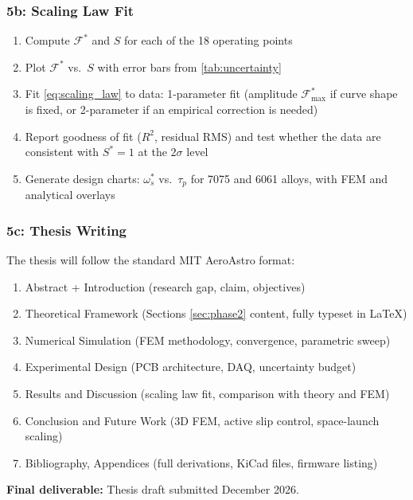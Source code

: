 \documentclass[12pt,letterpaper]{article}
\begin{document}
\subsubsection{5b: Scaling Law Fit}

\begin{enumerate}[noitemsep, label=\arabic*.]
  \item Compute $\mathcal{F}^*$ and $S$ for each of the 18 operating points
  \item Plot $\mathcal{F}^*$ vs.\ $S$ with error bars from \cref{tab:uncertainty}
  \item Fit \cref{eq:scaling_law} to data: 1-parameter fit (amplitude $\mathcal{F}^*_{\max}$
    if curve shape is fixed, or 2-parameter if an empirical correction is needed)
  \item Report goodness of fit ($R^2$, residual RMS) and test whether the data
    are consistent with $S^* = 1$ at the $2\sigma$ level
  \item Generate design charts: $\omega_s^*$ vs.\ $\tau_p$ for 7075 and 6061 alloys,
    with FEM and analytical overlays
\end{enumerate}

\subsubsection{5c: Thesis Writing}

The thesis will follow the standard MIT AeroAstro format:
\begin{enumerate}[noitemsep, label=\arabic*.]
  \item Abstract + Introduction (research gap, claim, objectives)
  \item Theoretical Framework (Sections \ref{sec:phase2} content, fully typeset in \LaTeX)
  \item Numerical Simulation (FEM methodology, convergence, parametric sweep)
  \item Experimental Design (PCB architecture, DAQ, uncertainty budget)
  \item Results and Discussion (scaling law fit, comparison with theory and FEM)
  \item Conclusion and Future Work (3D FEM, active slip control, space-launch scaling)
  \item Bibliography, Appendices (full derivations, KiCad files, firmware listing)
\end{enumerate}

\textbf{Final deliverable:} Thesis draft submitted December 2026.
\end{document}
